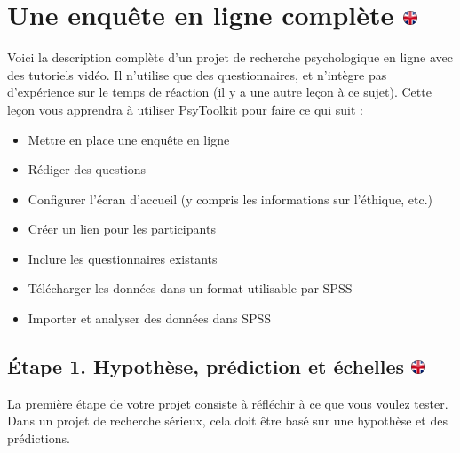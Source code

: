 \documentclass[
]{book}
\providecommand{\tightlist}{%
  \setlength{\itemsep}{0pt}\setlength{\parskip}{0pt}}
\begin{document}
\hypertarget{une-enquuxeate-en-ligne-compluxe8te}{%
\chapter[Une enquête en ligne complète ]{\texorpdfstring{Une enquête en ligne complète \href{https://www.psytoolkit.org/lessons/questionnaire-project.html}{\protect\includegraphics{img/ukflag.png}}}{Une enquête en ligne complète }}\label{une-enquuxeate-en-ligne-compluxe8te}}

Voici la description complète d'un projet de recherche psychologique en ligne avec des tutoriels vidéo. Il n'utilise que des questionnaires, et n'intègre pas d'expérience sur le temps de réaction (il y a une autre leçon à ce sujet). Cette leçon vous apprendra à utiliser PsyToolkit pour faire ce qui suit :

\begin{itemize}
\tightlist
\item
  Mettre en place une enquête en ligne
\item
  Rédiger des questions
\item
  Configurer l'écran d'accueil (y compris les informations sur l'éthique, etc.)
\item
  Créer un lien pour les participants
\item
  Inclure les questionnaires existants
\item
  Télécharger les données dans un format utilisable par SPSS
\item
  Importer et analyser des données dans SPSS
\end{itemize}

\hypertarget{uxe9tape-1.-hypothuxe8se-pruxe9diction-et-uxe9chelles}{%
\section[Étape 1. Hypothèse, prédiction et échelles ]{\texorpdfstring{Étape 1. Hypothèse, prédiction et échelles \href{https://www.psytoolkit.org/lessons/questionnaire-project.html\#_step_1_hypothesis_prediction_and_scales}{\protect\includegraphics{img/ukflag.png}}}{Étape 1. Hypothèse, prédiction et échelles }}\label{uxe9tape-1.-hypothuxe8se-pruxe9diction-et-uxe9chelles}}

La première étape de votre projet consiste à réfléchir à ce que vous voulez tester. Dans un projet de recherche sérieux, cela doit être basé sur une hypothèse et des prédictions.
\end{document}

